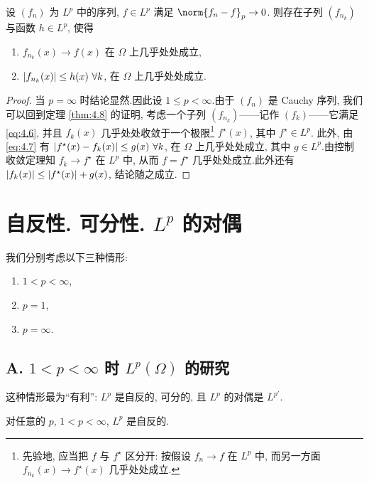 \begin{theorem}
\label{thm:4.9}
设 $(f_n)$ 为 $L^p$ 中的序列, $f\in L^p$ 满足 $\norm{f_n-f}_p\to0$.
则存在子列 $(f_{n_k})$ 与函数 $h\in L^p$, 使得
\begin{enumerate}[label=(\alph*), leftmargin=2.2em, itemsep=0.1em]
	\item $f_{n_k}(x)\to f(x)$ 在 $\Omega$ 上几乎处处成立,
	\item $\left|f_{n_k}(x)\right|\le h(x)\ \forall k$, 在 $\Omega$ 上几乎处处成立.
\end{enumerate}
\end{theorem}

\begin{proof}
当 $p=\infty$ 时结论显然.因此设 $1\le p<\infty$.由于 $(f_n)$ 是 Cauchy 序列,
我们可以回到定理  \ref{thm:4.8} 的证明, 考虑一个子列 $(f_{n_k})$——记作
$(f_k)$——它满足 \eqref{eq:4.6}, 并且 $f_k(x)$ 几乎处处收敛于一个极限\footnote{先验地,
应当把 $f$ 与 $f^\star$ 区分开: 按假设 $f_n\to f$ 在 $L^p$ 中, 而另一方面
$f_{n_k}(x)\to f^\star(x)$ 几乎处处成立.} $f^\star(x)$, 其中 $f^\star\in L^p$.
此外, 由 \eqref{eq:4.7} 有 $\left|f^\star(x)-f_k(x)\right|\le g(x)\ \forall k$, 在
$\Omega$ 上几乎处处成立, 其中 $g\in L^p$.由控制收敛定理知 $f_k\to f^\star$ 在
$L^p$ 中, 从而 $f=f^\star$ 几乎处处成立.此外还有
$\left|f_k(x)\right|\le\left|f^\star(x)\right|+g(x)$, 结论随之成立.
\end{proof}

\section{自反性. 可分性. $L^p$ 的对偶}
\label{sec:4.3}

我们分别考虑以下三种情形:
\begin{enumerate}[label=(\Alph*), leftmargin=2.6em, itemsep=0.1em]
	\item $1<p<\infty$,
	\item $p=1$,
	\item $p=\infty$.
\end{enumerate}

\subsection*{A. $1<p<\infty$ 时 $L^p(\Omega)$ 的研究}

这种情形最为``有利'': $L^p$ 是自反的, 可分的, 且 $L^p$ 的对偶是 $L^{p'}$.

\begin{keytheorem}
\label{thm:4.10}
对任意的 $p$, $1<p<\infty$, $L^p$ 是自反的.
\end{keytheorem}

